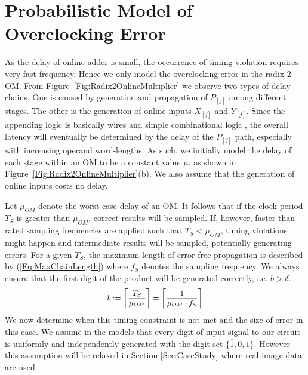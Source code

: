 \documentclass{acm_proc_article-sp}
\begin{document}
\section{Probabilistic Model of\\Overclocking Error}
As the delay of online adder is small, the occurrence of timing violation requires very fast frequency. Hence we only model the overclocking error in the radix-2 OM. From Figure~\ref{Fig:Radix2OnlineMultiplier} we observe two types of delay chains. One is caused by generation and propagation of $P_{[j]}$ among different stages. The other is the generation of online inputs $X_{[j]}$ and $Y_{[j]}$. Since the appending logic is basically wires and simple combinational logic \cite{Online_Conversion}, the overall latency will eventually be determined by the delay of the $P_{[j]}$ path, especially with increasing operand word-lengths. As such, we initially model the delay of each stage within an OM to be a constant value $\mu$, as shown in Figure~\ref{Fig:Radix2OnlineMultiplier}(b). We also assume that the generation of online inputs costs no delay.\vspace{-1ex}

Let $\mu_{OM}$ denote the worst-case delay of an OM. It follows that if the clock period $T_S$ is greater than $\mu_{OM}$, correct results will be sampled. If, however, faster-than-rated sampling frequencies are applied such that $T_S<\mu_{OM}$, timing violations might happen and intermediate results will be sampled, potentially generating errors. For a given $T_S$, the maximum length of error-free propagation is described by (\ref{Eq:MaxChainLength}) where $f_S$ denotes the sampling frequency. We always ensure that the first digit of the product will be generated correctly, i.e. $b>\delta$.
%
\begin{eqnarray}\label{Eq:MaxChainLength}
\footnotesize
  b:=\left\lceil \frac{T_S}{\mu_{OM}} \right\rceil=\left\lceil \frac{1}{\mu_{OM}\cdot f_S}\right\rceil
\normalsize
\end{eqnarray}
%
We now determine when this timing constraint is not met and the size of error in this case. We assume in the models that every digit of input signal to our circuit is uniformly and independently generated with the digit set $\{\overline{1},0,1\}$. However this assumption will be relaxed in Section \ref{Sec:CaseStudy} where real image data are used.
\end{document}
